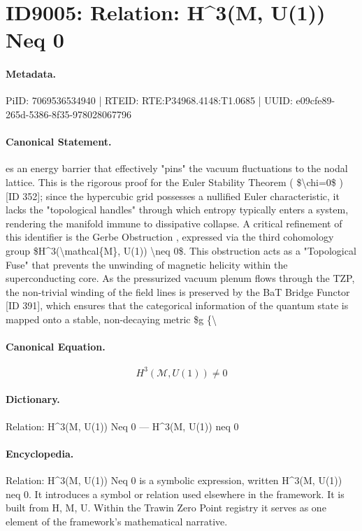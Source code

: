 \section*{ID9005: Relation: H\textasciicircum{}3(M, U(1)) Neq 0}
\paragraph{Metadata.}
PiID: 7069536534940 | RTEID: RTE:P34968.4148:T1.0685 | UUID: e09cfe89-265d-5386-8f35-978028067796

\paragraph{Canonical Statement.}
es an energy barrier that effectively "pins" the vacuum fluctuations to the nodal lattice. This is the rigorous proof for the Euler Stability Theorem ( \$\textbackslash{}chi=0\$ ) [ID 352]; since the hypercubic grid possesses a nullified Euler characteristic, it lacks the "topological handles" through which entropy typically enters a system, rendering the manifold immune to dissipative collapse. A critical refinement of this identifier is the Gerbe Obstruction , expressed via the third cohomology group \$H\textasciicircum{}3(\textbackslash{}mathcal\{M\}, U(1)) \textbackslash{}neq 0\$. This obstruction acts as a "Topological Fuse" that prevents the unwinding of magnetic helicity within the superconducting core. As the pressurized vacuum plenum flows through the TZP, the non-trivial winding of the field lines is preserved by the BaT Bridge Functor [ID 391], which ensures that the categorical information of the quantum state is mapped onto a stable, non-decaying metric \$g \{\textbackslash{}

\paragraph{Canonical Equation.}
\[
H^3(\mathcal{M}, U(1)) \neq 0
\]

\paragraph{Dictionary.}
Relation: H\textasciicircum{}3(M, U(1)) Neq 0 — H\textasciicircum{}3(M, U(1)) neq 0

\paragraph{Encyclopedia.}
Relation: H\textasciicircum{}3(M, U(1)) Neq 0 is a symbolic expression, written H\textasciicircum{}3(M, U(1)) neq 0. It introduces a symbol or relation used elsewhere in the framework. It is built from H, M, U. Within the Trawin Zero Point registry it serves as one element of the framework's mathematical narrative.
